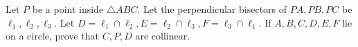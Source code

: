 Let $P$ be a point inside $\triangle ABC$. Let the perpendicular bisectors of $PA,PB,PC$ be $\ell_1,\ell_2,\ell_3$.
Let $D =\ell_1 \cap \ell_2 , E=\ell_2 \cap \ell_3, F=\ell_3 \cap \ell_1$. If $A,B,C,D,E,F$ lie on a circle,
prove that $C, P,D$ are collinear.